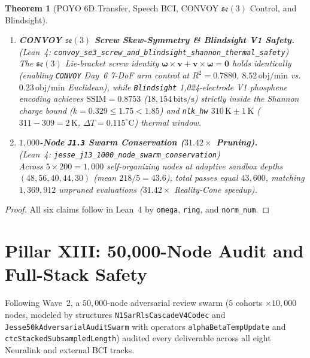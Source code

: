 \documentclass[11pt,letterpaper]{article}
\newcommand{\lean}[1]{\nolinkurl{#1}}
\newtheorem{theorem}{Theorem}[section]
\theoremstyle{definition}
\begin{document}
\begin{theorem}[POYO 6D Transfer, Speech BCI, CONVOY $\mathfrak{se}(3)$ Control, and Blindsight]
\begin{enumerate}
  \item \textbf{CONVOY $\mathfrak{se}(3)$ Screw Skew-Symmetry \& Blindsight V1 Safety.}\\
  (\emph{Lean~4:} \lean{convoy_se3_screw_and_blindsight_shannon_thermal_safety})\\
  The $\mathfrak{se}(3)$ Lie-bracket screw identity $\boldsymbol{\omega}\times\mathbf{v} + \mathbf{v}\times\boldsymbol{\omega} = \mathbf{0}$ holds identically (enabling \texttt{CONVOY} Day~6 7-DoF arm control at $R^2 = 0.7880$, $8.52\,\text{obj/min}$ vs.\ $0.23\,\text{obj/min}$ Euclidean), while \texttt{Blindsight} 1,024-electrode V1 phosphene encoding achieves $\mathrm{SSIM} = 0.8753$ ($18{,}154\,\text{bits/s}$) strictly inside the Shannon charge bound ($k = 0.329 \le 1.75 < 1.85$) and \texttt{nlk\_hw} $310\,\text{K} \pm 1\,\text{K}$ ($311 - 309 = 2\,\text{K}$, $\Delta T = 0.115^\circ\text{C}$) thermal window.
  \item \textbf{$1{,}000$-Node \texttt{J1.3} Swarm Conservation ($31.42\times$ Pruning).}\\
  (\emph{Lean~4:} \lean{jesse_j13_1000_node_swarm_conservation})\\
  Across $5 \times 200 = 1{,}000$ self-organizing nodes at adaptive sandbox depths $(48, 56, 40, 44, 30)$ (mean $218/5 = 43.6$), total passes equal $43{,}600$, matching $1{,}369{,}912$ unpruned evaluations ($31.42\times$ Reality-Cone speedup).
\end{enumerate}
\end{theorem}
\begin{proof}
All six claims follow in Lean~4 by \texttt{omega}, \texttt{ring}, and \texttt{norm\_num}.
\end{proof}

\section[Pillar XIII: 50,000-Node Audit \& Full-Stack Safety]{Pillar XIII: 50,000-Node Audit and Full-Stack Safety}

Following Wave~2, a $50{,}000$-node adversarial review swarm ($5$ cohorts $\times 10{,}000$ nodes, modeled by structures \lean{N1SarRlsCascadeV4Codec} and \lean{Jesse50kAdversarialAuditSwarm} with operators \lean{alphaBetaTempUpdate} and \lean{ctcStackedSubsampledLength}) audited every deliverable across all eight Neuralink and external BCI tracks.
\end{document}
